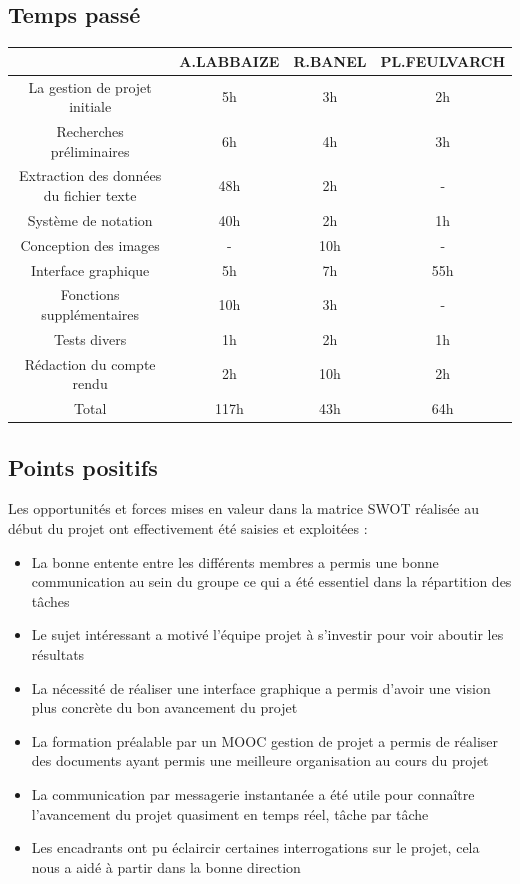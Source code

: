 \documentclass[light]{ceri}
\begin{document}
\subsection{Temps passé}
\begin{center}
\begin{tabular} {|c|c|c|c|}
\hline {}& {A.LABBAIZE} & {R.BANEL} & {PL.FEULVARCH} \\
\hline {La gestion de projet initiale} & {5h} & {3h} & {2h} \\
\hline {Recherches préliminaires} & {6h} & {4h} & {3h} \\
\hline {Extraction des données du fichier texte} & {48h} & {2h} & {-} \\
\hline {Système de notation} & {40h} & {2h} & {1h} \\
\hline {Conception des images} & {-} & {10h} & {-} \\
\hline {Interface graphique} & {5h} & {7h} & {55h} \\
\hline {Fonctions supplémentaires} & {10h} & {3h} & {-} \\
\hline {Tests divers} & {1h} & {2h} & {1h} \\
\hline {Rédaction du compte rendu} & {2h} & {10h} & {2h} \\
\hline {Total} & {117h} & {43h} & {64h} \\   
\hline
\end{tabular}
\end{center}


\subsection{Points positifs}
Les opportunités et forces mises en valeur dans la matrice SWOT réalisée au début du projet ont effectivement été saisies et exploitées : \\

\begin{itemize}
    \item La bonne entente entre les différents membres a permis une bonne communication au sein du groupe ce qui a été essentiel dans la répartition des tâches
    \item Le sujet intéressant a motivé l'équipe projet à s'investir pour voir aboutir les résultats
    
    \item La nécessité de réaliser une interface graphique a permis d'avoir une vision plus concrète du bon avancement du projet
    
    \item La formation préalable par un MOOC gestion de projet a permis de réaliser des documents ayant permis une meilleure organisation au cours du projet
    
    \item La communication par messagerie instantanée a été utile pour connaître l'avancement du projet quasiment en temps réel, tâche par tâche 
    
    
    \item Les encadrants ont pu éclaircir certaines interrogations sur le projet, cela nous a aidé à partir dans la bonne direction
    
    
\end{itemize}
\end{document}
